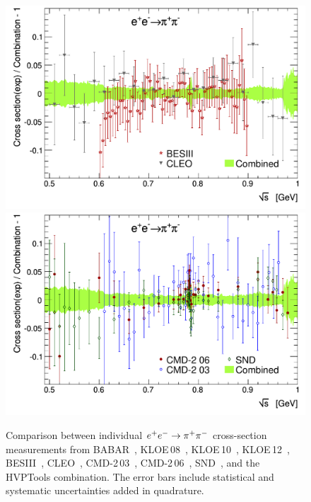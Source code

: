 \begin{figure}[p]
\begin{center}
\includegraphics[width=\figsize]{Figures/diffRel_channel_ePeM_to_piPpiM_bescleo_dhmz19.pdf}\hspace{\fighspace}
\includegraphics[width=\figsize]{Figures/diffRel_channel_ePeM_to_piPpiM_CMD2SND_dhmz19.pdf}
\end{center}
\vspace{-0.2cm}
\caption[.]{ 
            Comparison between individual $e^+e^-\to\pi^+\pi^-$ cross-section measurements from 
            BABAR~\cite{babarpipi1,babarpipi2},  KLOE\,08~\cite{kloe08}, KLOE\,10~\cite{kloe10},
            KLOE\,12~\cite{kloe12}, BESIII~\cite{bes2015}, CLEO~\cite{cleo2017},
            CMD-2\,03~\cite{cmd203}, CMD-2\,06~\cite{cmd2new}, SND~\cite{snd2pi}, and 
            the HVPTools combination. The error bars include statistical and systematic 
            uncertainties added in quadrature. 
}
\label{fig:comppipi}

\end{figure}
